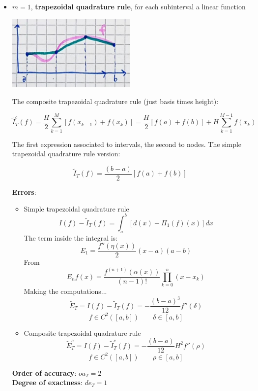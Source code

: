 \begin{itemize}
    \item $m=1$, \textbf{trapezoidal quadrature rule}, for each subinterval a linear function
    \begin{center}
        \includegraphics[width=0.5\textwidth]{images/quadrature_m1.png}
    \end{center}
    The composite trapezoidal quadrature rule (just basis times height):
    \begin{LARGE}
        $$
        \tilde{I}_{T}^c(f)=
        \frac{H}{2}
        \sum_{k=1}^M
        \left[
            f(x_{k-1})+f(x_k)
        \right]=
        \frac{H}{2}
        \left[
            f(a)+f(b)
        \right]+
        H\sum_{k=1}^{M-1}f(x_k)
        $$
    \end{LARGE}
    The first expression associated to intervals, the second to nodes. The simple trapezoidal quadrature rule version:
    \begin{LARGE}
        $$
        \tilde{I}_T(f)=\frac{(b-a)}{2}\left[f(a)+f(b)\right]
        $$
    \end{LARGE}
    \textbf{Errors}:
    \begin{itemize}
        \item Simple trapezoidal quadrature rule
        $$
        I(f)-\tilde{I}_T(f)=\int_a^b\left[d(x)-\Pi_1(f)(x)\right]dx
        $$
        The term inside the integral is:
        $$
        E_1=\frac{f''(\eta(x))}{2}(x-a)(a-b)
        $$
        From
        $$
        E_nf(x)=\frac{f^{(n+1)}(\alpha(x))}{(n-1)!}\prod_{k=0}^n(x-x_k)
        $$
        Making the computations...
        $$
        \tilde{E}_T=I(f)-\tilde{I}_T(f)=
        -\frac{(b-a)^3}{12}f''(\delta)
        $$
        $$
        f\in C^2([a,b])\qquad\delta\in[a,b]
        $$
        \item Composite trapezoidal quadrature rule
        $$
        \tilde{E}_T^c=I(f)-\tilde{I}_T^c(f)=
        -\frac{(b-a)}{12}H^2f''(\rho)
        $$
        $$
        f\in C^2([a,b])\qquad\rho\in[a,b]
        $$
    \end{itemize}
    \textbf{Order of accuracy}: $oa_{T}=2$\\
    \textbf{Degree of exactness}: $de_{T}=1$\\

\end{itemize}
